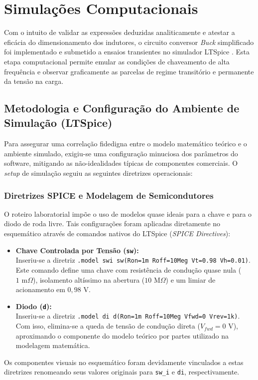 \chapter{Simulações Computacionais}

Com o intuito de validar as expressões deduzidas analiticamente e atestar a eficácia do dimensionamento dos indutores, o circuito conversor \textit{Buck} simplificado foi implementado e submetido a ensaios transientes no simulador LTSpice \cite{ltspice}. Esta etapa computacional permite emular as condições de chaveamento de alta frequência e observar graficamente as parcelas de regime transitório e permanente da tensão na carga.

\section{Metodologia e Configuração do Ambiente de Simulação (LTSpice)}

Para assegurar uma correlação fidedigna entre o modelo matemático teórico e o ambiente simulado, exigiu-se uma configuração minuciosa dos parâmetros do software, mitigando as não-idealidades típicas de componentes comerciais. O \textit{setup} de simulação seguiu as seguintes diretrizes operacionais:

\subsection{Diretrizes SPICE e Modelagem de Semicondutores}
O roteiro laboratorial impõe o uso de modelos quase ideais para a chave e para o diodo de roda livre. Tais configurações foram aplicadas diretamente no esquemático através de comandos nativos do LTSpice (\textit{SPICE Directives}):
\begin{itemize}
	\item \textbf{Chave Controlada por Tensão (\texttt{sw}):}\\
	 Inseriu-se a diretriz \texttt{.model swi sw(Ron=1m Roff=10Meg Vt=0.98 Vh=0.01)}. Este comando define uma chave com resistência de condução quase nula ($1\text{ m}\Omega$), isolamento altíssimo na abertura ($10\text{ M}\Omega$) e um limiar de acionamento em $0,98\text{ V}$.
	\item \textbf{Diodo (\texttt{d}):}\\
	 Inseriu-se a diretriz \texttt{.model di d(Ron=1m Roff=10Meg Vfwd=0 Vrev=1k)}.\\
	 Com isso, elimina-se a queda de tensão de condução direta ($V_{fwd} = 0\text{ V}$), aproximando o componente do modelo teórico por partes utilizado na modelagem matemática.
\end{itemize}
Os componentes visuais no esquemático foram devidamente vinculados a estas diretrizes renomeando seus valores originais para \texttt{sw\_i} e \texttt{di}, respectivamente.

